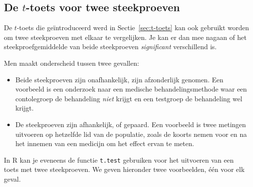 \subsection{De \texorpdfstring{$t$}{t}-toets voor twee steekproeven}
\label{ssec:t-toets-twee-steekproeven}

De $t$-toets die geïntroduceerd werd in Sectie~\ref{sec:t-toets} kan ook gebruikt worden om twee steekproeven met elkaar te vergelijken. Je kan er dan mee nagaan of het steekproefgemiddelde van beide steekproeven \emph{significant} verschillend is.

Men maakt onderscheid tussen twee gevallen:

\begin{itemize}
  \item Beide steekproeven zijn onafhankelijk, zijn afzonderlijk genomen. Een voorbeeld is een onderzoek naar een medische behandelingsmethode waar een contolegroep de behandeling \emph{niet} krijgt en een testgroep de behandeling wel krijgt.
  \item De steekproeven zijn afhankelijk, of gepaard. Een voorbeeld is twee metingen uitvoeren op hetzelfde lid van de populatie, zoals de koorts nemen voor en na het innemen van een medicijn om het effect ervan te meten.
\end{itemize}

In R kan je eveneens de functie \texttt{t.test} gebruiken voor het uitvoeren van een toets met twee steekproeven. We geven hieronder twee voorbeelden, één voor elk geval.

